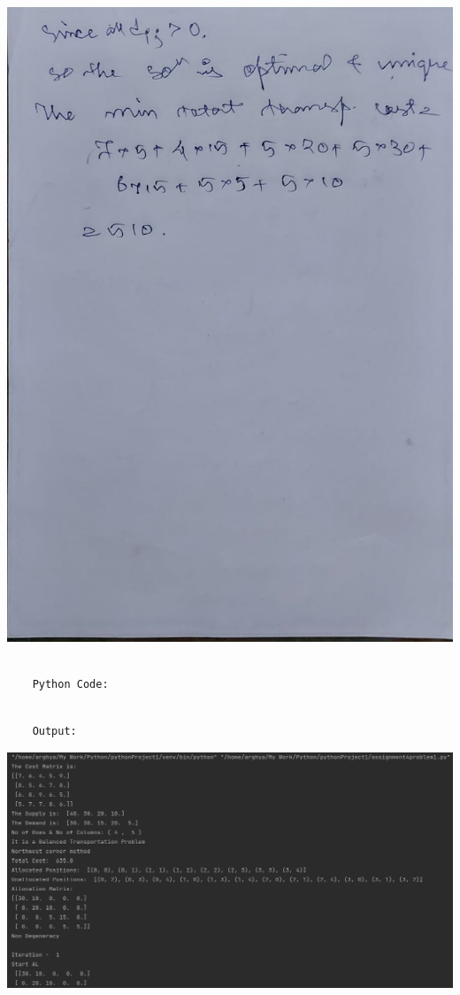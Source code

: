 \documentclass[12pt, letterpaper, twoside]{book}
\begin{document}
\includegraphics[width=\paperwidth, height=\paperheight]{Page24}
\begin{lstlisting}

	Python Code:

\end{lstlisting}

\pagebreak
\begin{lstlisting}

	Output:

\end{lstlisting}

\includegraphics[width=550pt]{Output1}
\end{document}
